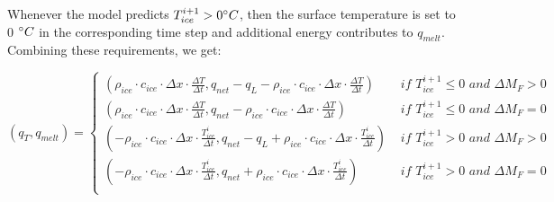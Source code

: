 \documentclass[utf8]{frontiersSCNS} %
\begin{document}
Whenever the model predicts $T_{ice}^{i+1} > 0 \degree C$, then the surface temperature is set to 0 $\degree C$ in the
corresponding time step and additional energy contributes to $q_{melt}$. Combining these requirements, we get:

\begin{equation} (q_{T}, q_{melt}) = \left\{ \begin{array}{ll} ( \rho_{ice} \cdot c_{ice} \cdot  \Delta x \cdot
    \frac{\Delta T}{\Delta t}, q_{net}-q_{L}-\rho_{ice} \cdot c_{ice} \cdot  \Delta x \cdot \frac{\Delta T}{\Delta t}) &
    \textit{ if } T_{ice}^{i+1}\leq 0 \textit{ and } \Delta M_{F} > 0\\ ( \rho_{ice} \cdot c_{ice} \cdot  \Delta x \cdot
    \frac{\Delta T}{\Delta t}, q_{net}-\rho_{ice} \cdot c_{ice} \cdot  \Delta x \cdot \frac{\Delta T}{\Delta t}) &
    \textit{ if } T_{ice}^{i+1}\leq 0 \textit{ and } \Delta M_{F} = 0\\
        ( -\rho_{ice} \cdot c_{ice} \cdot  \Delta x \cdot \frac{T_{ice}^{i}}{\Delta t}, q_{net}-q_{L}+\rho_{ice} \cdot
        c_{ice} \cdot \Delta x \cdot \frac{T_{ice}^{i}}{\Delta t}) & \textit{ if } T_{ice}^{i+1}> 0 \textit{ and }
        \Delta M_{F} > 0\\ ( -\rho_{ice} \cdot c_{ice} \cdot  \Delta x \cdot \frac{T_{ice}^{i}}{\Delta t},
        q_{net}+\rho_{ice} \cdot c_{ice} \cdot  \Delta x \cdot \frac{T_{ice}^{i}}{\Delta t}) & \textit{ if }
    T_{ice}^{i+1}> 0 \textit{ and } \Delta M_{F} = 0\\ \end{array} \right.  \label{eqn:qt} \end{equation}
\end{document}
